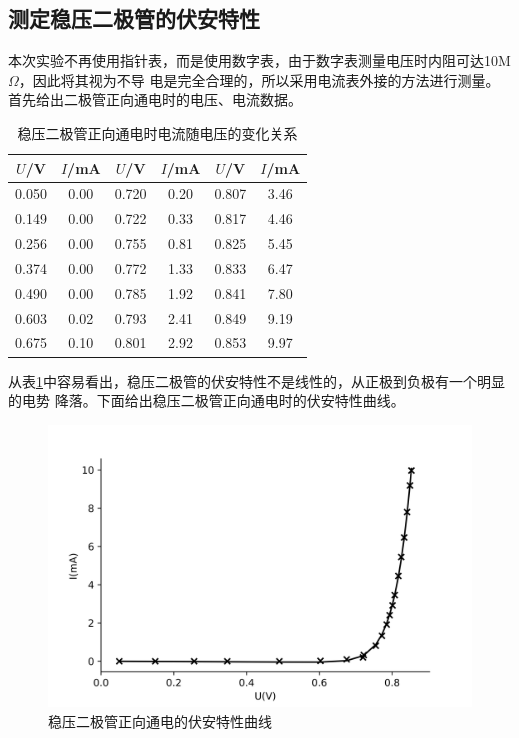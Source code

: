 \documentclass[a4paper]{ctexart}
\begin{document}
	\subsection{测定稳压二极管的伏安特性}
		\par 
		本次实验不再使用指针表，而是使用数字表，由于数字表测量电压时内阻可达10M$\Omega$，因此将其视为不导
		电是完全合理的，所以采用电流表外接的方法进行测量。首先给出二极管正向通电时的电压、电流数据。
		\begin{table}[htbp]
			\centering
			\caption{稳压二极管正向通电时电流随电压的变化关系}
			\label{diode_relation+}
			\begin{tabular}{cc|cc|cc}
				\toprule
				$U$/V & $I$/mA & $U$/V & $I$/mA & $U$/V & $I$/mA\\
				\midrule
				0.050 & 0.00 & 0.720 & 0.20 & 0.807 & 3.46 \\
				0.149 & 0.00 & 0.722 & 0.33 & 0.817 & 4.46 \\
				0.256 & 0.00 & 0.755 & 0.81 & 0.825 & 5.45 \\
				0.374 & 0.00 & 0.772 & 1.33 & 0.833 & 6.47 \\
				0.490 & 0.00 & 0.785 & 1.92 & 0.841 & 7.80 \\
				0.603 & 0.02 & 0.793 & 2.41 & 0.849 & 9.19 \\
				0.675 & 0.10 & 0.801 & 2.92 & 0.853 & 9.97 \\
				\bottomrule
			\end{tabular}
		\end{table}
		\par 
		从表\ref{diode_relation+}中容易看出，稳压二极管的伏安特性不是线性的，从正极到负极有一个明显的电势
		降落。下面给出稳压二极管正向通电时的伏安特性曲线。
		\begin{figure}[htbp]
			\centering
			\includegraphics[scale=0.65]{diode_curve+}
			\caption{稳压二极管正向通电的伏安特性曲线}
			\label{diode_curve+}
		\end{figure}
\end{document}

